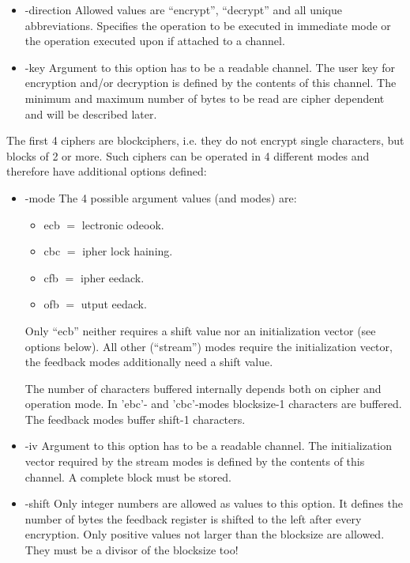 \documentclass {report}
\begin{document}
\begin {itemize}
\item [-direction]	Allowed values are ``encrypt'', ``decrypt'' and all
			unique abbreviations. Specifies the operation
			to be executed in immediate mode or the
			operation executed upon  if
			attached to a channel.

\item [-key]		Argument to this option has to be a readable
			channel. The user key for encryption and/or
			decryption is defined by the contents of this
			channel. The minimum and maximum number of
			bytes to be read are cipher dependent and will
			be described later.
\end   {itemize}

The first 4 ciphers are blockciphers, i.e. they do not encrypt single
characters, but blocks of 2 or more. Such ciphers can be operated in 4
different modes and therefore have additional options defined:

\begin {itemize}
\item[-mode]	The 4 possible argument values (and modes) are:
	\begin {itemize}
	\item[ecb]	$=$ lectronic odeook.
	\item[cbc]	$=$ ipher lock haining.
	\item[cfb]	$=$ ipher eedack.
	\item[ofb]	$=$ utput eedack.
	\end   {itemize}

	Only ``ecb'' neither requires a shift value nor an initialization
	vector (see options below). All other (``stream'') modes require
	the initialization vector, the feedback modes additionally
	need a shift value.

	The number of characters buffered internally depends both on
	cipher and operation mode.
	In 'ebc'- and 'cbc'-modes blocksize-1 characters are buffered.
	The feedback modes buffer shift-1 characters.


\item[-iv]	Argument to this option has to be a readable
		channel. The initialization vector required by the
		stream modes is defined by the contents of this
		channel. A complete block must be stored.

\item[-shift]	Only integer numbers are allowed as values to this
		option. It defines the number of bytes the feedback
		register is shifted to the left after every
		encryption. Only positive values not larger than the
		blocksize are allowed. They must be a divisor of the
		blocksize too!
\end   {itemize}
\end{document}
